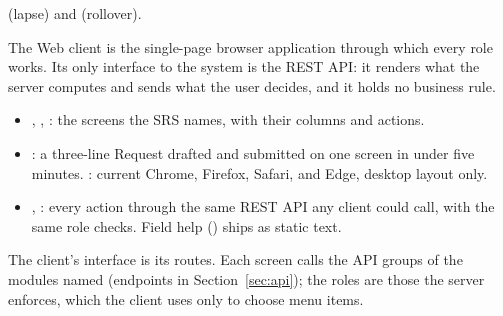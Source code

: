  (lapse) and  (rollover).


The Web client is the single-page browser application through which every role works. Its only interface to the system is the REST API: it renders what the server computes and sends what the user decides, and it holds no business rule.

\begin{itemize}
\item {}, , : the screens the SRS names, with their columns and actions.
\item {}: a three-line Request drafted and submitted on one screen in under five minutes. : current Chrome, Firefox, Safari, and Edge, desktop layout only.
\item {}, : every action through the same REST API any client could call, with the same role checks. Field help () ships as static text.
\end{itemize}

The client's interface is its routes. Each screen calls the API groups of the modules named (endpoints in Section~\ref{sec:api}); the roles are those the server enforces, which the client uses only to choose menu items.

